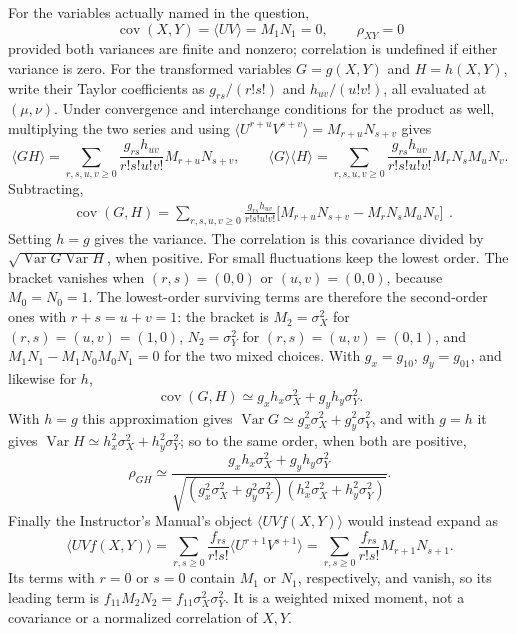 For the variables actually named in the question,
\[
\boxed{\operatorname{cov}(X,Y)=\langle UV\rangle=M_1N_1=0,
\qquad\rho_{XY}=0}
\]
provided both variances are finite and nonzero; correlation is
undefined if either variance is zero. For the transformed variables
$G=g(X,Y)$ and $H=h(X,Y)$,
write their Taylor coefficients as $g_{rs}/(r!s!)$ and $h_{uv}/(u!v!)$,
all evaluated at $(\mu,\nu)$. Under convergence and interchange
conditions for the product as well, multiplying the two series and
using $\langle U^{r+u}V^{s+v}\rangle=M_{r+u}N_{s+v}$ gives
\[
\langle GH\rangle=\sum_{r,s,u,v\ge0}
\frac{g_{rs}h_{uv}}{r!s!u!v!}M_{r+u}N_{s+v},
\qquad
\langle G\rangle\langle H\rangle=\sum_{r,s,u,v\ge0}
\frac{g_{rs}h_{uv}}{r!s!u!v!}M_rN_sM_uN_v.
\]
Subtracting,
\[
\boxed{\begin{aligned}
\operatorname{cov}(G,H)=\sum_{r,s,u,v\ge0}
\frac{g_{rs}h_{uv}}{r!s!u!v!}
\big[M_{r+u}N_{s+v}-M_rN_sM_uN_v\big]
\end{aligned}}.
\]
Setting $h=g$ gives the variance. The correlation is this covariance
divided by $\sqrt{\operatorname{Var}G\operatorname{Var}H}$, when positive.
For small fluctuations keep the lowest order. The bracket vanishes when
$(r,s)=(0,0)$ or $(u,v)=(0,0)$, because $M_0=N_0=1$. The lowest-order
surviving terms are therefore the second-order ones with $r+s=u+v=1$:
the bracket is $M_2=\sigma_X^2$ for
$(r,s)=(u,v)=(1,0)$, $N_2=\sigma_Y^2$ for $(r,s)=(u,v)=(0,1)$, and
$M_1N_1-M_1N_0M_0N_1=0$ for the two mixed choices. With $g_x=g_{10}$,
$g_y=g_{01}$, and likewise for $h$,
\[
\operatorname{cov}(G,H)\simeq g_xh_x\sigma_X^2+g_yh_y\sigma_Y^2.
\]
With $h=g$ this approximation gives
$\operatorname{Var}G\simeq g_x^2\sigma_X^2+g_y^2\sigma_Y^2$, and with
$g=h$ it gives $\operatorname{Var}H\simeq h_x^2\sigma_X^2+h_y^2\sigma_Y^2$;
so to the same order, when both are positive,
\[
\rho_{GH}\simeq\frac{g_xh_x\sigma_X^2+g_yh_y\sigma_Y^2}
{\sqrt{(g_x^2\sigma_X^2+g_y^2\sigma_Y^2)(h_x^2\sigma_X^2+h_y^2\sigma_Y^2)}}.
\]
Finally the Instructor's Manual's object $\langle UVf(X,Y)\rangle$ would
instead expand as
\[
\langle UVf(X,Y)\rangle
=\sum_{r,s\ge0}\frac{f_{rs}}{r!s!}\langle U^{r+1}V^{s+1}\rangle
=\sum_{r,s\ge0}\frac{f_{rs}}{r!s!}M_{r+1}N_{s+1}.
\]
Its terms with $r=0$ or $s=0$
contain $M_1$ or $N_1$, respectively, and vanish, so its leading term is
$f_{11}M_2N_2=f_{11}\sigma_X^2\sigma_Y^2$. It is a weighted mixed moment,
not a covariance or a normalized correlation of $X,Y$.


